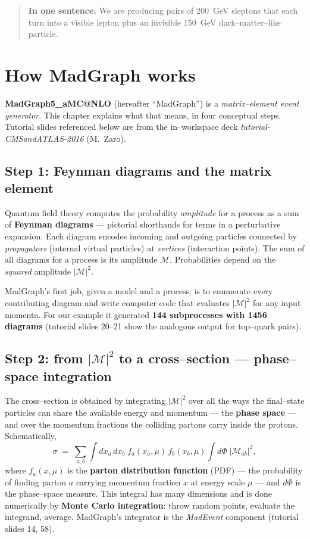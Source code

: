 \documentclass[11pt,oneside]{report}
\begin{document}
\begin{quote}\textbf{In one sentence.} We are producing pairs of 200~GeV sleptons that each turn
into a visible lepton plus an invisible 150~GeV dark--matter--like particle.\end{quote}

\chapter{How MadGraph works}
\label{ch:madgraph}

\textbf{MadGraph5\_aMC@NLO} (hereafter ``MadGraph'') is a \emph{matrix--element event generator}.
This chapter explains what that means, in four conceptual steps. Tutorial slides referenced below
are from the in--workspace deck \emph{tutorial-CMSandATLAS-2016} (M.~Zaro).

\section{Step 1: Feynman diagrams and the matrix element}
Quantum field theory computes the probability \emph{amplitude} for a process as a sum of
\textbf{Feynman diagrams} --- pictorial shorthands for terms in a perturbative expansion. Each
diagram encodes incoming and outgoing particles connected by \emph{propagators} (internal virtual
particles) at \emph{vertices} (interaction points). The sum of all diagrams for a process is its
amplitude $\mathcal{M}$. Probabilities depend on the \emph{squared} amplitude $|\mathcal{M}|^2$.

MadGraph's first job, given a model and a process, is to enumerate every contributing diagram and
write computer code that evaluates $|\mathcal{M}|^2$ for any input momenta. For our example it
generated \textbf{144 subprocesses with 1456 diagrams} (tutorial slides 20--21 show the analogous
output for top--quark pairs).

\section{Step 2: from $|\mathcal{M}|^2$ to a cross--section --- phase--space integration}
The cross--section is obtained by integrating $|\mathcal{M}|^2$ over all the ways the final--state
particles can share the available energy and momentum --- the \textbf{phase space} --- and over the
momentum fractions the colliding partons carry inside the protons. Schematically,
\begin{equation}
  \sigma \;=\; \sum_{a,b}\int \! dx_a\,dx_b\; f_a(x_a,\mu)\,f_b(x_b,\mu)
            \int d\Phi\; |\mathcal{M}_{ab}|^2 ,
  \label{eq:xsec}
\end{equation}
where $f_a(x,\mu)$ is the \textbf{parton distribution function} (PDF) --- the probability of finding
parton $a$ carrying momentum fraction $x$ at energy scale $\mu$ --- and $d\Phi$ is the
phase--space measure. This integral has many dimensions and is done numerically by \textbf{Monte
Carlo integration}: throw random points, evaluate the integrand, average. MadGraph's integrator is
the \emph{MadEvent} component (tutorial slides 14, 58).
\end{document}
